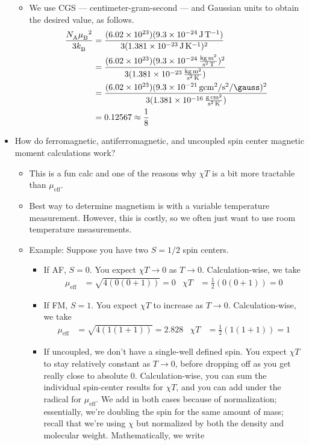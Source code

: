 \documentclass[../notes.tex]{subfiles}
\begin{document}
\begin{itemize}
\begin{itemize}
        \item We use CGS --- centimeter-gram-second --- and Gaussian units to obtain the desired value, as follows.
        \begin{align*}
            \frac{\NA\mB^2}{3\kB} &= \frac{(\num{6.02e23})(\SI{9.3e-24}{\joule\per\tesla})}{3(\SI{1.381e-23}{\joule\per\kelvin})^2}\\
            &= \frac{(\num{6.02e23})(\SI[per-mode=fraction]{9.3e-24}{\kilo\gram\meter\squared\per\second\squared\per\tesla})^2}{3(\SI[per-mode=fraction]{1.381e-23}{\kilo\gram\meter\squared\per\second\squared\per\kelvin})}\\
            &= \frac{(\num{6.02e23})(\SI[per-mode=fraction]{9.3e-21}{\gram\centi\meter\squared\per\second\squared\per\gauss})^2}{3(\SI[per-mode=fraction]{1.381e-16}{\gram\centi\meter\squared\per\second\squared\per\kelvin})}\\
            &= 0.12567 \approx \frac{1}{8}
        \end{align*}
    \end{itemize}
    \item How do ferromagnetic, antiferromagnetic, and uncoupled spin center magnetic moment calculations work?
    \begin{itemize}
        \item This is a fun calc and one of the reasons why $\chi T$ is a bit more tractable than $\mu_\text{eff}$.
        \item Best way to determine magnetism is with a variable temperature measurement. However, this is costly, so we often just want to use room temperature measurements.
        \item Example: Suppose you have two $S=1/2$ spin centers.
        \begin{itemize}
            \item If AF, $S=0$. You expect $\chi T\to 0$ as $T\to 0$. Calculation-wise, we take
            \begin{align*}
                \mu_\text{eff} &= \sqrt{4(0(0+1))} = 0&
                \chi T &= \frac{1}{2}(0(0+1)) = 0
            \end{align*}
            \item If FM, $S=1$. You expect $\chi T$ to increase as $T\to 0$. Calculation-wise, we take
            \begin{align*}
                \mu_\text{eff} &= \sqrt{4(1(1+1))} = 2.828&
                \chi T &= \frac{1}{2}(1(1+1)) = 1
            \end{align*}
            \item If uncoupled, we don't have a single-well defined spin. You expect $\chi T$ to stay relatively constant as $T\to 0$, before dropping off as you get really close to absolute 0. Calculation-wise, you can sum the individual spin-center results for $\chi T$, and you can add under the radical for $\mu_\text{eff}$. We add in both cases because of normalization; essentially, we're doubling the spin for the same amount of mass; recall that we're using $\chi$ but normalized by both the density and molecular weight. Mathematically, we write

\end{itemize}
\end{itemize}
\end{itemize}
\end{document}
